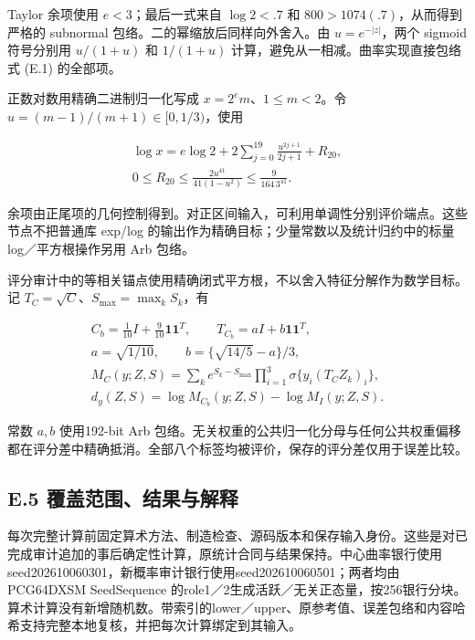 \documentclass[11pt,a4paper]{article}
\begin{document}
Taylor 余项使用 \(e<3\)；最后一式来自 \(\log2<.7\) 和
\(800>1074(.7)\)，从而得到严格的 subnormal
包络。二的幂缩放后同样向外舍入。由 \(u=e^{-|z|}\)，两个 sigmoid
符号分别用 \(u/(1+u)\) 和 \(1/(1+u)\)
计算，避免从一相减。曲率实现直接包络式 (E.1) 的全部项。

正数对数用精确二进制归一化写成 \(x=2^em\)、\(1\le m<2\)。令
\(u=(m-1)/(m+1)\in[0,1/3)\)，使用

\[
\begin{gathered}
\log x=e\log2+2\sum_{j=0}^{19}\frac{u^{2j+1}}{2j+1}+R_{20},\\
0\le R_{20}\le\frac{2u^{41}}{41(1-u^2)}
\le\frac9{164\,3^{41}}.
\end{gathered}
\tag{E.7}
\]

余项由正尾项的几何控制得到。对正区间输入，可利用单调性分别评价端点。这些节点不把普通库
exp/log 的输出作为精确目标；少量常数以及统计归约中的标量
log／平方根操作另用 Arb 包络。

评分审计中的等相关锚点使用精确闭式平方根，不以舍入特征分解作为数学目标。记
\(T_C=\sqrt C\)、\(S_{\max}=\max_kS_k\)，有

\[
\begin{gathered}
C_b=\tfrac1{10}I+\tfrac9{10}\mathbf1\mathbf1^T,\qquad
T_{C_b}=aI+b\mathbf1\mathbf1^T,\\
a=\sqrt{1/10},\qquad b=\{\sqrt{14/5}-a\}/3,\\
M_C(y;Z,S)=\sum_ke^{S_k-S_{\max}}\prod_{i=1}^3\sigma\{y_i(T_CZ_k)_i\},\\
d_y(Z,S)=\log M_{C_b}(y;Z,S)-\log M_I(y;Z,S).
\end{gathered}
\tag{E.8}
\]

常数 \(a,b\) 使用192-bit Arb
包络。无关权重的公共归一化分母与任何公共权重偏移都在评分差中精确抵消。全部八个标签均被评价，保存的评分差仅用于误差比较。

\subsection*{E.5
覆盖范围、结果与解释}\label{e.5-ux8986ux76d6ux8303ux56f4ux7ed3ux679cux4e0eux89e3ux91ca}

每次完整计算前固定算术方法、制造检查、源码版本和保存输入身份。这些是对已完成审计追加的事后确定性计算，原统计合同与结果保持。中心曲率银行使用seed202610060301，新概率审计银行使用seed202610060501；两者均由
PCG64DXSM SeedSequence
的role1／2生成活跃／无关正态量，按256银行分块。算术计算没有新增随机数。带索引的lower／upper、原参考值、误差包络和内容哈希支持完整本地复核，并把每次计算绑定到其输入。
\end{document}
